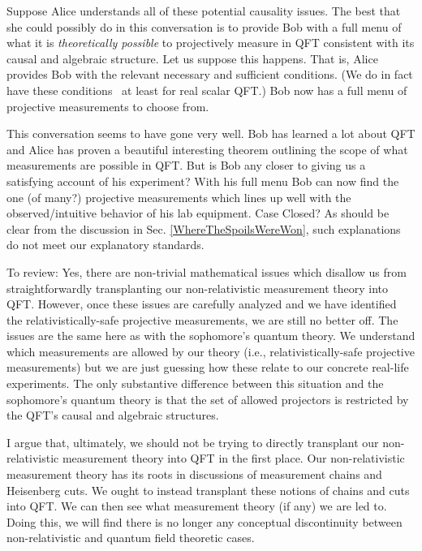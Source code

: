 \documentclass[prd,twocolumn,superscriptaddress,floatfix,amsmath,amssymb,amsfonts,nofootinbib]{revtex4-2}
\begin{document}
Suppose Alice understands all of these potential causality issues. The best that she could possibly do in this conversation is to provide Bob with a full menu of what it is \textit{theoretically possible} to projectively measure in QFT consistent with its causal and algebraic structure. Let us suppose this happens. That is, Alice provides Bob with the relevant necessary and sufficient conditions. (We do in fact have these conditions~\cite{Jubb2022,BorstenJubbKells} at least for real scalar QFT.) Bob now has a full menu of projective measurements to choose from.

This conversation seems to have gone very well. Bob has learned a lot about QFT and Alice has proven a beautiful interesting theorem outlining the scope of what measurements are possible in QFT. But is Bob any closer to giving us a satisfying account of his experiment? With his full menu Bob can now find the one (of many?) projective measurements which lines up well with the observed/intuitive behavior of his lab equipment. Case Closed? As should be clear from the discussion in Sec. \ref{WhereTheSpoilsWereWon}, such explanations do not meet our explanatory standards. 

To review: Yes, there are non-trivial mathematical issues which disallow us from straightforwardly transplanting our non-relativistic measurement theory into QFT. However, once these issues are carefully analyzed and we have identified the relativistically-safe projective measurements, we are still no better off. The issues are the same here as with the sophomore's quantum theory. We understand which measurements are allowed by our theory (i.e., relativistically-safe projective measurements) but we are just guessing how these relate to our concrete real-life experiments. The only substantive difference between this situation and the sophomore's quantum theory is that the set of allowed projectors is restricted by the QFT's causal and algebraic structures.

I argue that, ultimately, we should not be trying to directly transplant our non-relativistic measurement theory into QFT in the first place. Our non-relativistic measurement theory has its roots in discussions of measurement chains and Heisenberg cuts. We ought to instead transplant these notions of chains and cuts into QFT. We can then see what measurement theory (if any) we are led to. Doing this, we will find there is no longer any conceptual discontinuity between non-relativistic and quantum field theoretic cases. %
\end{document}
